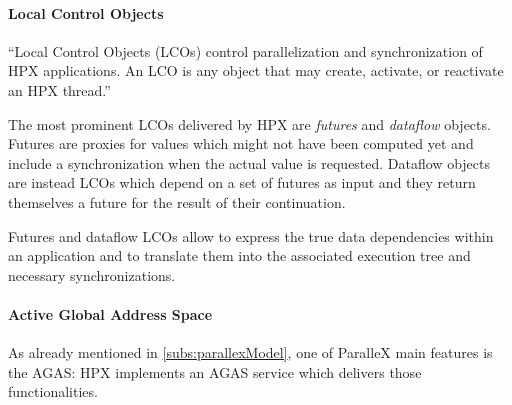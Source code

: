 \paragraph{Local Control Objects}
``Local Control Objects (LCOs) control parallelization and synchronization of
HPX applications. An LCO is any object that may create, activate, or reactivate
an HPX thread.''\cite{grubel2016dynamic}

The most prominent LCOs delivered by HPX are \emph{futures} and \emph{dataflow} objects. Futures are proxies for values which might not have been computed yet and include a synchronization when the actual value is requested. Dataflow objects are instead LCOs which depend on a set of futures as input and they return themselves a future for the result of their continuation.

Futures and dataflow LCOs allow to express the true data dependencies within an application and to translate them into the associated execution tree and necessary synchronizations.
\\ 

\paragraph{Active Global Address Space}
As already mentioned in \ref{subs:parallexModel}, one of ParalleX main features is the AGAS: HPX implements an AGAS service which delivers those functionalities.
\\ 

